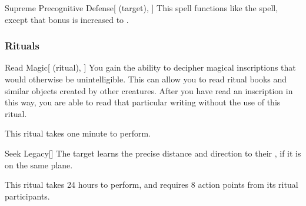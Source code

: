 \lowercase{\hypertarget{spell:Supreme Precognitive Defense}{}}\label{spell:Supreme Precognitive Defense}
\begin{attuneability}[\nth{7}]{\hypertarget{spell:Supreme Precognitive Defense}{Supreme Precognitive Defense}}[ (target), ]
This spell functions like the  spell, except that bonus is increased to .
\end{attuneability}
\vspace{0.25em}



\subsubsection{Rituals}


\lowercase{\hypertarget{spell:Read Magic}{}}\label{spell:Read Magic}
\begin{attuneability}[\nth{1}]{\hypertarget{spell:Read Magic}{Read Magic}}[ (ritual), ]
You gain the ability to decipher magical inscriptions that would otherwise be unintelligible.
This can allow you to read ritual books and similar objects created by other creatures.
After you have read an inscription in this way, you are able to read that particular writing without the use of this ritual.

This ritual takes one minute to perform.
\end{attuneability}
\vspace{0.25em}



\lowercase{\hypertarget{spell:Seek Legacy}{}}\label{spell:Seek Legacy}
\begin{apability}[\nth{2}]{\hypertarget{spell:Seek Legacy}{Seek Legacy}}[]
The target learns the precise distance and direction to their , if it is on the same plane.

This ritual takes 24 hours to perform, and requires 8 action points from its ritual participants.
\end{apability}
\vspace{0.25em}



